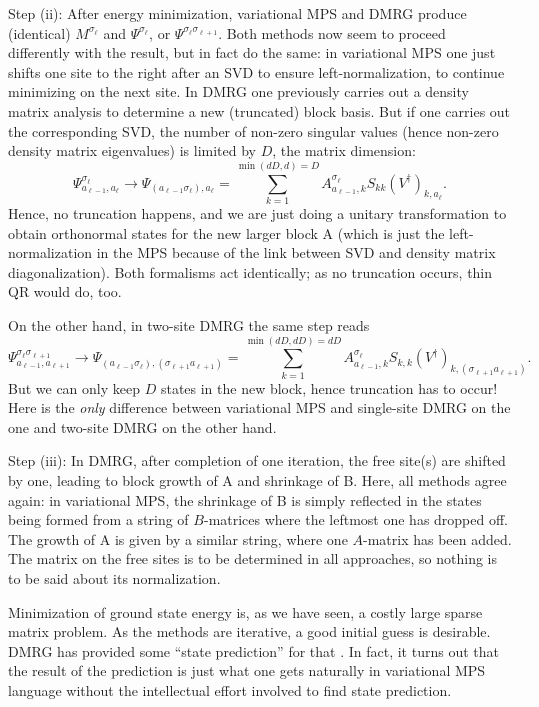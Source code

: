 \documentclass[a4paper,10pt,oneside,onecolumn,1p,times]{elsarticle}
\begin{document}
Step (ii): After energy minimization, variational MPS and DMRG produce (identical) $M^{\sigma_\ell}$ and $\Psi^{\sigma_\ell}$, or $\Psi^{\sigma_\ell \sigma_{\ell+1}}$. Both methods now seem to proceed differently with the result, but in fact do the same: in variational MPS one just shifts one site to the right after an SVD to ensure left-normalization, to continue minimizing on the next site. In DMRG one previously carries out a density matrix analysis to determine a new (truncated) block basis. But if one carries out the corresponding SVD, the number of non-zero singular values (hence non-zero density matrix eigenvalues) is limited by $D$, the matrix dimension: 
\begin{equation}
\Psi^{\sigma_\ell}_{a_{\ell-1},a_ \ell} \rightarrow \Psi_{(a_{\ell-1} \sigma_ \ell), a_ \ell} = \sum_{k=1}^{\min(dD,d)=D} A^{\sigma_ \ell}_{a_{\ell-1},k} S_{kk} (V^\dagger)_{k, a_ \ell} .
\end{equation}
Hence, no truncation happens, and we are just doing a unitary transformation to obtain orthonormal states for the new larger block A (which is just the left-normalization in the MPS because of the link between SVD and density matrix diagonalization). Both formalisms act identically; as no truncation occurs, thin QR would do, too.

On the other hand, in two-site DMRG the same step reads
\begin{equation}
\Psi^{\sigma_ \ell\sigma_{\ell +1}}_{a_{\ell-1},a_{\ell +1}} \rightarrow \Psi_{(a_{\ell-1} \sigma_ \ell), (\sigma_{\ell +1} a_{\ell +1})} = \sum_{k=1}^{\min(dD,dD)=dD} A^{\sigma_ \ell}_{a_{\ell-1},k} S_{k,k} (V^\dagger)_{k,(\sigma_{\ell +1} a_{\ell +1})} .
\end{equation}
But we can only keep $D$ states in the new block, hence truncation has to occur! Here is the {\em only} difference between variational MPS and single-site DMRG on the one and two-site DMRG on the other hand.

Step (iii): In DMRG, after completion of one iteration, the free site(s) are shifted by one, leading to block growth of A and shrinkage of B. Here, all methods agree again: in variational MPS, the shrinkage of B is simply reflected in the states being formed from a string of $B$-matrices where the leftmost one has dropped off. The growth of A is given by a similar string, where one $A$-matrix has been added. The matrix on the free sites is to be determined in all approaches, so nothing is to be said about its normalization.

Minimization of ground state energy is, as we have seen, a costly large sparse matrix problem. As the methods are iterative, a good initial guess is desirable. DMRG has provided some ``state prediction'' for that \cite{White96}. In fact, it turns out that the result of the prediction is just what one gets naturally in variational MPS language without the intellectual effort involved to find state prediction. 
\end{document}

